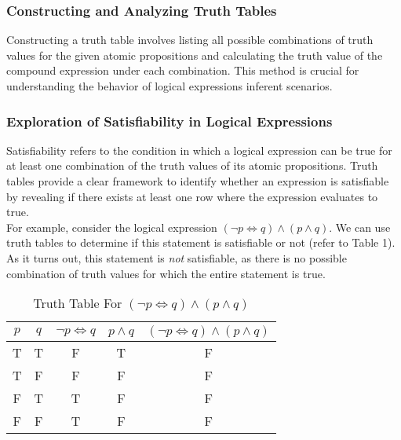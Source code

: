 \documentclass{article}
\begin{document}
    
        \subsubsection{Constructing and Analyzing Truth Tables}
            Constructing a truth table involves listing all possible combinations of truth values for the given atomic propositions and calculating the truth value of the compound expression under each combination. This method is crucial for understanding the behavior of logical expressions inferent scenarios.
        
        \subsubsection{Exploration of Satisfiability in Logical Expressions}
            Satisfiability refers to the condition in which a logical expression can be true for at least one combination of the truth values of its atomic propositions. Truth tables provide a clear framework to identify whether an expression is satisfiable by revealing if there exists at least one row where the expression evaluates to true. \\
            
            \noindent For example, consider the logical expression $(\neg p\iff q) \land (p\land q)$. We can use truth tables to determine if this statement is satisfiable or not (refer to Table 1). As it turns out, this statement is \textit{not} satisfiable, as there is no possible combination of truth values for which the entire statement is true.


            \vspace{2cm}


            \begin{table}[h!]
                \centering
                \begin{tabular}{c|c||c|c|c}
                    $p$ & $q$ & $\neg p\iff q$ & $p\land q$ & $(\neg p\iff q) \land (p\land q)$ \\
                    \hline
                    T & T & F & T & F \\
                    T & F & F & F & F \\
                    F & T & T & F & F \\
                    F & F & T & F & F \\
                \end{tabular}
                \caption{Truth Table For $(\neg p\iff q) \land (p\land q)$}
            \end{table}
            
\end{document}

